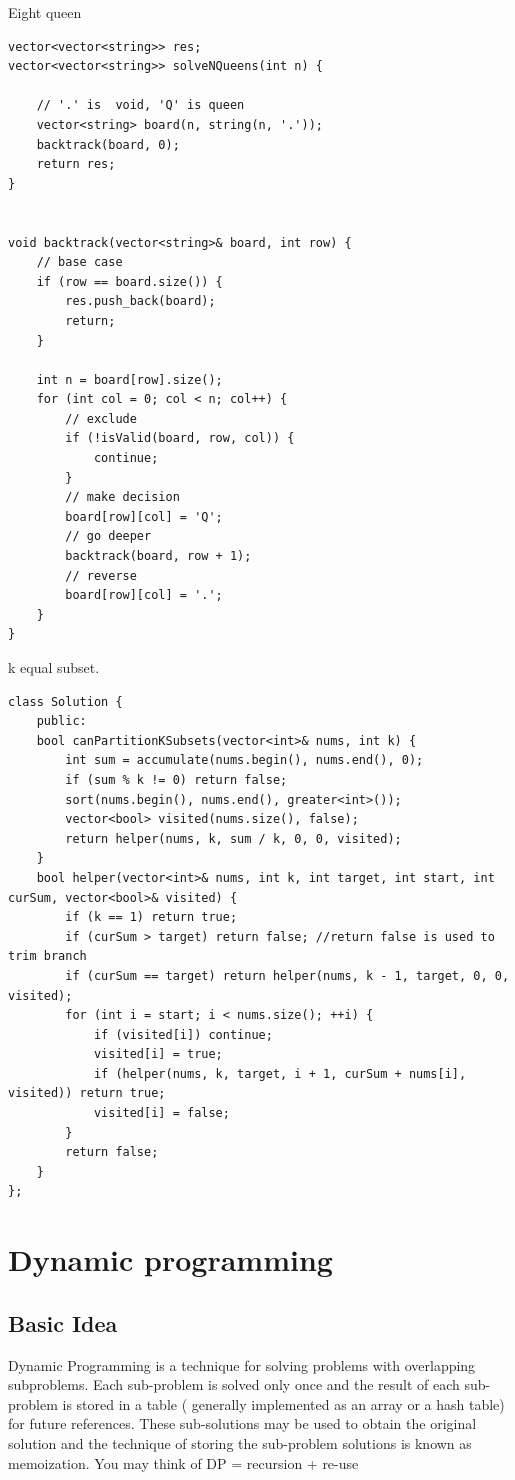 \documentclass[a4paper,11pt,twoside]{book}
\begin{document}
	\par Eight queen
	
\begin{lstlisting}
vector<vector<string>> res;
vector<vector<string>> solveNQueens(int n) {
	
	// '.' is  void, 'Q' is queen
	vector<string> board(n, string(n, '.'));
	backtrack(board, 0);
	return res;
}


void backtrack(vector<string>& board, int row) {
	// base case
	if (row == board.size()) {
		res.push_back(board);
		return;
	}
	
	int n = board[row].size();
	for (int col = 0; col < n; col++) {
		// exclude
		if (!isValid(board, row, col)) {
			continue;
		}
		// make decision
		board[row][col] = 'Q';
		// go deeper
		backtrack(board, row + 1);
		// reverse
		board[row][col] = '.';
	}
}	
\end{lstlisting}	
	


	\par k equal subset.
	
\begin{lstlisting}
class Solution {
	public:
	bool canPartitionKSubsets(vector<int>& nums, int k) {
		int sum = accumulate(nums.begin(), nums.end(), 0);
		if (sum % k != 0) return false;
		sort(nums.begin(), nums.end(), greater<int>());
		vector<bool> visited(nums.size(), false);
		return helper(nums, k, sum / k, 0, 0, visited);
	}
	bool helper(vector<int>& nums, int k, int target, int start, int curSum, vector<bool>& visited) {
		if (k == 1) return true;
		if (curSum > target) return false; //return false is used to trim branch
		if (curSum == target) return helper(nums, k - 1, target, 0, 0, visited);  
		for (int i = start; i < nums.size(); ++i) {
			if (visited[i]) continue;
			visited[i] = true;
			if (helper(nums, k, target, i + 1, curSum + nums[i], visited)) return true;
			visited[i] = false;
		}
		return false;
	}
};	
\end{lstlisting}	
	

\section{Dynamic programming}
\subsection{Basic Idea}

	\par Dynamic Programming is a technique for solving problems with overlapping subproblems. Each sub-problem is solved only once and the result of each sub-problem is stored in a table ( generally implemented as an array or a hash table) for future references. These sub-solutions may be used to obtain the original solution and the technique of storing the sub-problem solutions is known as memoization. You may think of DP = recursion + re-use
	
\end{document}
